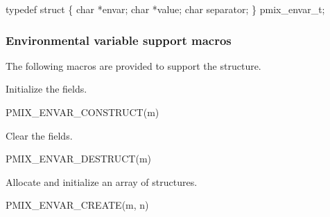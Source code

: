\cspecificstart
\begin{codepar}
typedef struct \{
    char *envar;
    char *value;
    char separator;
\} pmix_envar_t;
\end{codepar}
\cspecificend

\subsubsection{Environmental variable support macros}

The following macros are provided to support the  structure.


Initialize the  fields.

\cspecificstart
\begin{codepar}
PMIX_ENVAR_CONSTRUCT(m)
\end{codepar}
\cspecificend

\begin{arglist}
\end{arglist}


Clear the  fields.

\cspecificstart
\begin{codepar}
PMIX_ENVAR_DESTRUCT(m)
\end{codepar}
\cspecificend

\begin{arglist}
\end{arglist}



Allocate and initialize an array of  structures.

\cspecificstart
\begin{codepar}
PMIX_ENVAR_CREATE(m, n)
\end{codepar}
\cspecificend

\begin{arglist}
\end{arglist}


